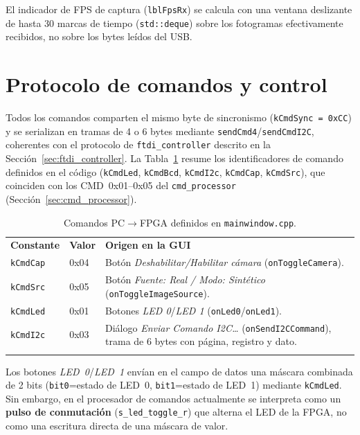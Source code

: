 \documentclass[../main.tex]{subfiles}
\begin{document}
El indicador de \ac{FPS} de captura (\texttt{lblFpsRx}) se calcula con una ventana deslizante de hasta 30 marcas de tiempo (\texttt{std::deque}) sobre los fotogramas efectivamente recibidos, no sobre los bytes leídos del USB.

\section{Protocolo de comandos y control}
\label{sec:protocolo_comandos}

Todos los comandos comparten el mismo byte de sincronismo (\texttt{kCmdSync~=~0xCC}) y se serializan en tramas de 4 o 6 bytes mediante \texttt{sendCmd4}/\texttt{sendCmdI2C}, coherentes con el protocolo de \texttt{ftdi\_controller} descrito en la Sección~\ref{sec:ftdi_controller}. La Tabla~\ref{tab:comandos_sw} resume los identificadores de comando definidos en el código (\texttt{kCmdLed}, \texttt{kCmdBcd}, \texttt{kCmdI2c}, \texttt{kCmdCap}, \texttt{kCmdSrc}), que coinciden con los CMD~0x01–0x05 del \texttt{cmd\_processor} (Sección~\ref{sec:cmd_processor}).

\begin{table}[H]
\centering
\caption{Comandos PC$\rightarrow$FPGA definidos en \texttt{mainwindow.cpp}.}
\label{tab:comandos_sw}
\begin{tabular}{>{\raggedright\arraybackslash}p{2.2cm}>{\raggedright\arraybackslash}p{2.5cm}>{\raggedright\arraybackslash}p{8.3cm}}
\rowcolor[HTML]{156082}
{\color{white}\textbf{Constante}} & {\color{white}\textbf{Valor}} & {\color{white}\textbf{Origen en la GUI}} \\
\rowcolor[HTML]{C0E6F5}
\texttt{kCmdCap} & 0x04 & Botón \textit{Deshabilitar/Habilitar cámara} (\texttt{onToggleCamera}). \\
\texttt{kCmdSrc} & 0x05 & Botón \textit{Fuente: Real / Modo: Sintético} (\texttt{onToggleImageSource}). \\
\rowcolor[HTML]{C0E6F5}
\texttt{kCmdLed} & 0x01 & Botones \textit{LED 0}/\textit{LED 1} (\texttt{onLed0}/\texttt{onLed1}). \\
\texttt{kCmdI2c} & 0x03 & Diálogo \textit{Enviar Comando I2C\ldots} (\texttt{onSendI2CCommand}), trama de 6 bytes con página, registro y dato. \\
\rowcolor[HTML]{C0E6F5}
\end{tabular}
\end{table}

Los botones \textit{LED~0}/\textit{LED~1} envían en el campo de datos una máscara combinada de 2 bits (\texttt{bit0}=estado de LED~0, \texttt{bit1}=estado de LED~1) mediante \texttt{kCmdLed}. Sin embargo, en el procesador de comandos actualmente se interpreta como un \textbf{pulso de conmutación} (\texttt{s\_led\_toggle\_r}) que alterna el LED de la FPGA, no como una escritura directa de una máscara de valor.
\end{document}
